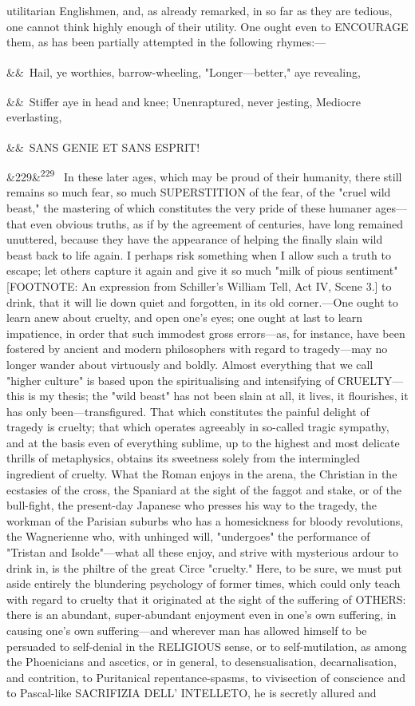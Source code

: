 \documentclass[12pt]{article}
\newcommand{\para}[1][]{\par\noindent\ifx&#1&\else\textsuperscript{\footnotesize #1}~\fi}
\begin{document}
utilitarian Englishmen, and, as already remarked, in so far as they are tedious, one cannot think highly enough of their utility. One ought even to ENCOURAGE them, as has been partially attempted in the following rhymes:---

\para Hail, ye worthies, barrow-wheeling, "Longer---better," aye revealing,

\para Stiffer aye in head and knee; Unenraptured, never jesting, Mediocre everlasting,

\para SANS GENIE ET SANS ESPRIT!

\para[229] In these later ages, which may be proud of their humanity, there still remains so much fear, so much SUPERSTITION of the fear, of the "cruel wild beast," the mastering of which constitutes the very pride of these humaner ages---that even obvious truths, as if by the agreement of centuries, have long remained unuttered, because they have the appearance of helping the finally slain wild beast back to life again. I perhaps risk something when I allow such a truth to escape; let others capture it again and give it so much "milk of pious sentiment" [FOOTNOTE: An expression from Schiller's William Tell, Act IV, Scene 3.] to drink, that it will lie down quiet and forgotten, in its old corner.---One ought to learn anew about cruelty, and open one's eyes; one ought at last to learn impatience, in order that such immodest gross errors---as, for instance, have been fostered by ancient and modern philosophers with regard to tragedy---may no longer wander about virtuously and boldly. Almost everything that we call "higher culture" is based upon the spiritualising and intensifying of CRUELTY---this is my thesis; the "wild beast" has not been slain at all, it lives, it flourishes, it has only been---transfigured. That which constitutes the painful delight of tragedy is cruelty; that which operates agreeably in so-called tragic sympathy, and at the basis even of everything sublime, up to the highest and most delicate thrills of metaphysics, obtains its sweetness solely from the intermingled ingredient of cruelty. What the Roman enjoys in the arena, the Christian in the ecstasies of the cross, the Spaniard at the sight of the faggot and stake, or of the bull-fight, the present-day Japanese who presses his way to the tragedy, the workman of the Parisian suburbs who has a homesickness for bloody revolutions, the Wagnerienne who, with unhinged will, "undergoes" the performance of "Tristan and Isolde"---what all these enjoy, and strive with mysterious ardour to drink in, is the philtre of the great Circe "cruelty." Here, to be sure, we must put aside entirely the blundering psychology of former times, which could only teach with regard to cruelty that it originated at the sight of the suffering of OTHERS: there is an abundant, super-abundant enjoyment even in one's own suffering, in causing one's own suffering---and wherever man has allowed himself to be persuaded to self-denial in the RELIGIOUS sense, or to self-mutilation, as among the Phoenicians and ascetics, or in general, to desensualisation, decarnalisation, and contrition, to Puritanical repentance-spasms, to vivisection of conscience and to Pascal-like SACRIFIZIA DELL' INTELLETO, he is secretly allured and 
\end{document}
